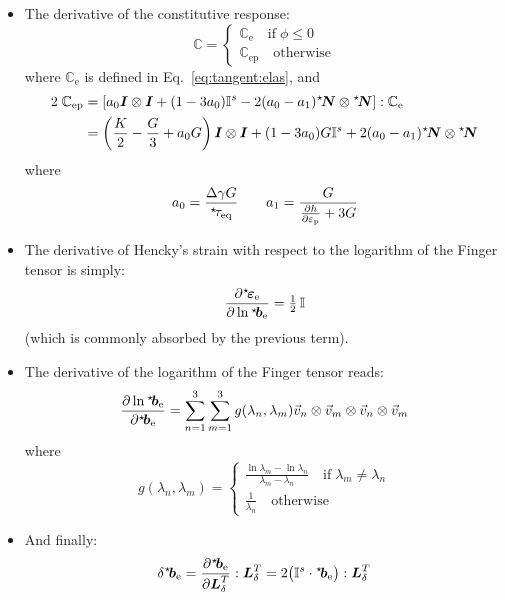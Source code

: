 \documentclass{goose-article}
\newcommand\ST[1]{\hspace*{-.3em}~^\star\!#1}
\newcommand\T[1]{\bm{{#1}}}
\newcommand\TT[1]{\mathbb{{#1}}}
\begin{document}
\begin{itemize}
  \item The derivative of the constitutive response:
  \begin{equation}
    \TT{C} =
    \begin{cases}
      \TT{C}_\mathrm{e} \quad\mathrm{if}\; \phi \leq 0 \\
      \TT{C}_\mathrm{ep} \quad\mathrm{otherwise}
    \end{cases}
  \end{equation}
  where $\TT{C}_\mathrm{e}$ is defined in Eq.~\eqref{eq:tangent:elas}, and
  \begin{align}
    2 \; \TT{C}_\mathrm{ep} &= \left[ a_0 \T{I} \otimes \T{I} + (1 - 3 a_0) \TT{I}^s - 2 (a_0 - a_1) \ST{\T{N}} \otimes \ST{\T{N}} \right] : \TT{C}_\mathrm{e}
    \\
    &= \left( \frac{K}{2} - \frac{G}{3} + a_0 G \right) \T{I} \otimes \T{I} + (1 - 3 a_0) G \TT{I}^s + 2 (a_0 - a_1) \ST{\T{N}} \otimes \ST{\T{N}}
  \end{align}
  where
  \begin{equation}
    a_0 = \frac{\Delta \gamma G}{\ST{\tau}_\mathrm{eq}}
    \qquad
    a_1 = \frac{G}{\frac{\partial h}{\partial \varepsilon_\mathrm{p}} + 3 G}
  \end{equation}
  \item The derivative of Hencky’s strain with respect to the logarithm of the Finger tensor is simply:
  \begin{equation}
    \frac{\partial \ST{\T{\varepsilon}}_\mathrm{e}}{\partial \ln \ST{\T{b}}_\mathrm{e}} = \tfrac{1}{2} \, \TT{I}
  \end{equation}
  (which is commonly absorbed by the previous term).
  \item The derivative of the logarithm of the Finger tensor reads:
  \begin{equation}
    \frac{\partial \ln \ST{\T{b}}_\mathrm{e}}{\partial \ST{\T{b}}_\mathrm{e}} = \sum\limits_{n=1}^3 \sum\limits_{m=1}^3 g(\lambda_n, \lambda_m) \vec{v}_n \otimes \vec{v}_m \otimes \vec{v}_n \otimes \vec{v}_m
  \end{equation}
  where
  \begin{equation}
    g(\lambda_n, \lambda_m) =
    \begin{cases}
      \displaystyle \frac{\ln \lambda_m - \ln \lambda_n}{\lambda_m - \lambda_n} \quad\mathrm{if}\; \lambda_m \neq \lambda_n \\
      \displaystyle \frac{1}{\lambda_n} \quad\mathrm{otherwise}
    \end{cases}
  \end{equation}
  \item And finally:
  \begin{equation}
    \delta \ST{\T{b}}_\mathrm{e} = \frac{\partial \ST{\T{b}}_\mathrm{e}}{\partial \T{L}_\delta^T} : \T{L}_\delta^T = 2 \big( \TT{I}^s \cdot \ST{\T{b}}_\mathrm{e} \big) : \T{L}_\delta^T
  \end{equation}
\end{itemize}
\end{document}
